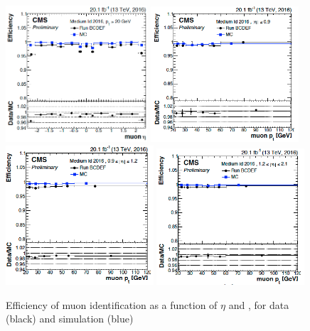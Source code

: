 \begin{figure}[!htpb]\centering
 \includegraphics[width=0.47\textwidth]{plots_and_figures/chapter4/muoneffveta.png}
 \includegraphics[width=0.49\textwidth]{plots_and_figures/chapter4/muoneffvpt1.png} \\
 \includegraphics[width=0.49\textwidth]{plots_and_figures/chapter4/muoneffvpt2.png}
 \includegraphics[width=0.49\textwidth]{plots_and_figures/chapter4/muoneffvpt3.png} 
\caption{Efficiency of muon identification as a function of $\eta$ and \pt, for data (black) and simulation (blue)}
 \label{fig:muoneff}
\end{figure}  
  
